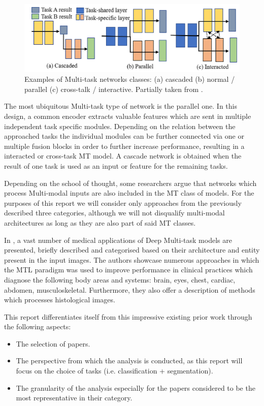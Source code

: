 \begin{figure}[htb]
    \centering
	\centerline{\includegraphics[scale=0.8]{figures/categories_mt_nets.png}}
	\caption{Examples of Multi-task networks classes: (a) cascaded (b) normal / parallel (c) cross-talk / interactive. Partially taken from \cite{zhao2023multi}.}
	\label{mt_net_categ}
\end{figure}

The most ubiquitous Multi-task type of network is the parallel one. In this design, a common encoder extracts valuable features which are sent in multiple independent task specific modules. Depending on the relation between the approached tasks the individual modules can be further connected via one or multiple fusion blocks in  order to further increase performance, resulting in a interacted or cross-task MT model. A cascade network is obtained when the result of one task is used as an input or feature for the remaining tasks.

Depending on the school of thought, some researchers argue that networks which process Multi-modal inputs are also included in the MT class of models. For the purposes of this report we will consider only approaches from the previously described three categories, although we will not disqualify multi-modal architectures as long as they are also part of said MT classes.

In \cite{zhao2023multi}, a vast number of medical applications of Deep Multi-task models are presented, briefly described and categorised based on their architecture and entity present in the input images. The authors showcase numerous approaches in which the MTL paradigm was used to improve performance in clinical practices which diagnose the following body areas and systems: brain, eyes, chest, cardiac, abdomen, musculoskeletal. Furthermore, they also offer a description of methods which processes histological images. 

This report differentiates itself from this impressive existing prior work through the following aspects:
\begin{itemize}
  \item The selection of papers.
  \item The perspective from which the analysis is conducted, as this report will focus on the choice of tasks (i.e. classification +  segmentation). 
  \item The granularity of the analysis especially for the papers considered to be the most representative in their category.
\end{itemize}